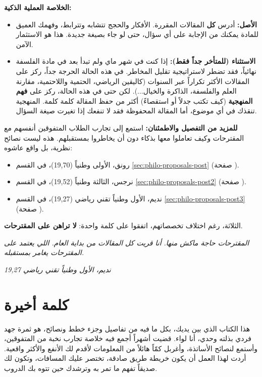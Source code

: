 \documentclass[12pt,a4paper]{book}
\newcommand{\quoteAr}[1]{%
	\begin{myquote}
		\itshape #1
	\end{myquote}
}
\begin{document}
	\textbf{الخلاصة العملية الذكية:}
	\begin{itemize}
		\item \textbf{الأصل:} أدرس \textbf{كل} المقالات المقررة. الأفكار والحجج تتشابه وتترابط، وفهمك العميق للمادة يمكنك من الإجابة على أي سؤال، حتى لو جاء بصيغة جديدة. هذا هو الاستثمار الآمن.
		\item \textbf{الاستثناء (للمتأخر جداً فقط):} إذا كنت في شهر ماي ولم تبدأ بعد في مادة الفلسفة نهائياً، فقد تضطر لاستراتيجية تقليل المخاطر. في هذه الحالة الحرجة جداً، ركز على المقالات الأكثر تكراراً عبر السنوات (كاليقين الرياضي، الحتمية واللاحتمية، مقارنة العلم والفلسفة، الذاكرة والخيال...). لكن حتى في هذه الحالة، ركز على \textbf{فهم المنهجية} (كيف تكتب جدلاً أو استقصاءً) أكثر من حفظ المقالة كلمة كلمة. المنهجية تنقذك في أي موضوع، أما المقالة المحفوظة فقد لا تنفعك إذا تغيرت صيغة السؤال.
	\end{itemize}
	
	\textbf{للمزيد من التفصيل والاطمئنان:}
	استمع إلى تجارب الطلاب المتفوقين أنفسهم مع المقترحات وكيف تعاملوا معها بذكاء دون أن يخاطروا بمستقبلهم. هذه ليست نصائح نظرية، بل واقع عاشوه:
	\begin{itemize}
		\item رونق، الأولى وطنياً (19,70)، في القسم \ref{sec:philo-proposals-post} (صفحة \pageref{sec:philo-proposals-post}).
		\item نرجس، الثالثة وطنياً (19,52)، في القسم \ref{sec:philo-proposals-post2} (صفحة \pageref{sec:philo-proposals-post2}).
		\item نديم، الأول وطنياً تقني رياضي (19,27)، في القسم \ref{sec:philo-proposals-post3} (صفحة \pageref{sec:philo-proposals-post3}).
	\end{itemize}
	
	الثلاثة، رغم اختلاف تخصصاتهم، اتفقوا على كلمة واحدة: \textbf{لا تراهن على المقترحات}.
	
	\quoteAr{المقترحات حاجة ماكش منها. أنا قريت كل المقالات من بداية العام. اللي يعتمد على المقترحات يغامر بمستقبله.}
	\textit{ نديم، الأول وطنياً تقني رياضي 19,27}



\chapter*{كلمة أخيرة}

هذا الكتاب الذي بين يديك، بكل ما فيه من تفاصيل وجزء خطط ونصائح، هو ثمرة جهد فردي بذلته وحدي، أنا لواء. قضيت أشهراً أجمع فيه خلاصة تجارب نخبة من المتفوقين، وأستمع لنصائح الأساتذة، وأغربل كمّاً هائلاً من المعلومات لأقدم لك الأنفع والأكثر واقعية. أردت لهذا العمل أن يكون خريطة طريق صادقة، تختصر عليك المسافات، وتكون لك صديقاً تفهم ما تمر به وترشدك حين تتوه بك الدروب.
\end{document}
